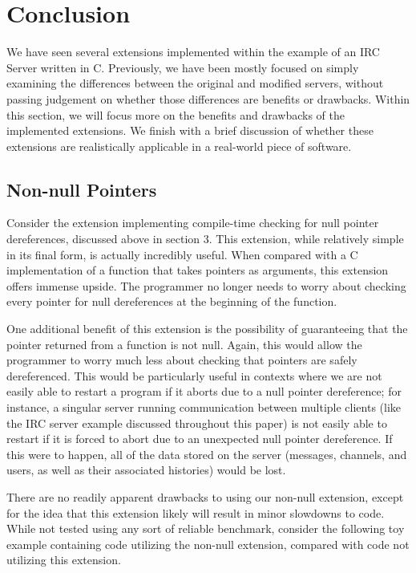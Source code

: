 \documentclass[main.tex]{subfiles}
\begin{document}
\section{Conclusion}
We have seen several extensions implemented within the example of an IRC Server written in C. Previously, we have been
mostly focused on simply examining the differences between the original and modified servers, without passing judgement on
whether those differences are benefits or drawbacks. Within this section, we will focus more on the benefits and drawbacks of
the implemented extensions. We finish with a brief discussion of whether these extensions are realistically applicable in a
real-world piece of software.

\subsection{Non-null Pointers}
Consider the extension implementing compile-time checking for null pointer dereferences, discussed above in section 3.
This extension, while relatively simple in its final form, is actually incredibly useful. When compared with a C implementation of
a function that takes pointers as arguments, this extension offers immense upside. The programmer no longer needs to worry
about checking every pointer for null dereferences at the beginning of the function.

One additional benefit of this extension is the possibility of guaranteeing that the pointer returned from a function is not null.
Again, this would allow the programmer to worry much less about checking that pointers are safely dereferenced. This would
be particularly useful in contexts where we are not easily able to restart a program if it aborts due to a null pointer 
dereference; for instance, a singular server running communication between multiple clients (like the IRC server example
discussed throughout this paper) is not easily able to restart if it is forced to abort due to an unexpected null pointer
dereference. If this were to happen, all of the data stored on the server (messages, channels, and users, as well as their
associated histories) would be lost.

There are no readily apparent drawbacks to using our non-null extension, except for the idea that this extension likely will
result in minor slowdowns to code. While not tested using any sort of reliable benchmark, consider the following toy example
containing code utilizing the non-null extension, compared with code not utilizing this extension.
\end{document}
